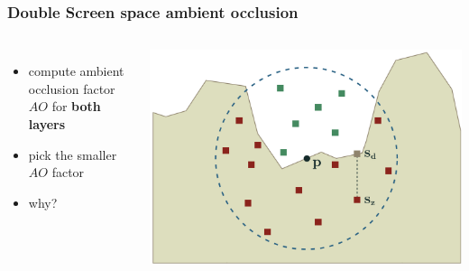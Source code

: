 \documentclass[aspectratio=169]{beamer}
\begin{document}
	\begin{frame}
		\frametitle{Double Screen space ambient occlusion}
		\begin{columns}
				\begin{itemize}
					\item compute ambient occlusion factor $AO$ for \textbf{both layers}
					\item pick the smaller $AO$ factor
					\item why?
					
				\end{itemize}
				\includegraphics[height=.65\textwidth]{img/ao_sphere_sampling.png}
		\end{columns}		
	\end{frame}	
\end{document}
